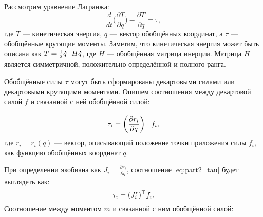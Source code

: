 Рассмотрим уравнение Лагранжа:
%
\begin{equation}
	\frac{d}{dt} \bigg( 
	\frac{\partial T }{\partial \dot{{q}}}
	\bigg) - 
	\frac{\partial T }{\partial {q}} = \tau,
\end{equation}
%
где $T$ --- кинетическая энергия, ${q}$ --- вектор обобщённых координат, а $\tau$ --- обобщённые крутящие моменты. Заметим, что кинетическая энергия может быть описана как $T = \frac{1}{2} \dot{{q}}^\top {H} \dot{{q}}$, где ${H}$ --- обобщённая матрица инерции. Матрица ${H}$ является симметричной, положительно определённой и полного ранга.

Обобщённые силы $\tau$ могут быть сформированы декартовыми силами или декартовыми крутящими моментами. Опишем соотношения между декартовой силой ${f}$ и связанной с ней обобщённой силой:

\begin{equation}
	\label{eq:part2_tau}
	\tau_i = \left( \frac{\partial {r}_i}{\partial {q}} \right)^\top {f}_i,
\end{equation}
%
где ${r}_i = {r}_i({q})$ --- вектор, описывающий положение точки приложения силы ${f}_i$, как функцию обобщённых координат ${q}$.

При определении якобиана как ${J}_i = \frac{\partial {r}_i}{\partial {q}}$, соотношение \eqref{eq:part2_tau} будет выглядеть как:
%
\begin{equation}
	\tau_i = ({J}^r_i)^\top {f}_i.
\end{equation}
%
Соотношение между моментом ${m}$ и связанной с ним обобщённой силой:

